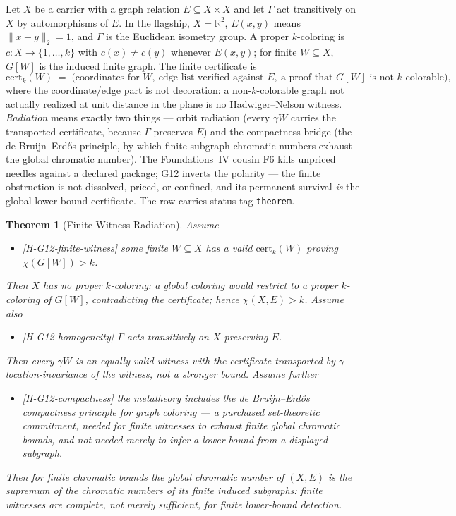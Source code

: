 \documentclass[11pt]{article}
\newcommand{\lawGTwelve}{Finite Witness Radiation}
\newtheorem{theorem}{Theorem}[section]
\theoremstyle{definition}
\begin{document}
Let $X$ be a carrier with a graph relation $E \subseteq X \times X$ and let $\Gamma$ act transitively
on $X$ by automorphisms of $E$. In the flagship, $X = \mathbb{R}^2$, $E(x,y)$ means
$\lVert x - y \rVert_2 = 1$, and $\Gamma$ is the Euclidean isometry group. A proper $k$-coloring is
$c : X \to \{1, \ldots, k\}$ with $c(x) \neq c(y)$ whenever $E(x,y)$; for finite $W \subseteq X$,
$G[W]$ is the induced finite graph. The finite certificate is
\[
  \mathrm{cert}_k(W) \;=\;
  \bigl(\text{coordinates for } W,\ \text{edge list verified against } E,\
  \text{a proof that } G[W] \text{ is not } k\text{-colorable}\bigr),
\]
where the coordinate/edge part is not decoration: a non-$k$-colorable graph not actually realized at
unit distance in the plane is no Hadwiger--Nelson witness. \emph{Radiation} means exactly two things
--- orbit radiation (every $\gamma W$ carries the transported certificate, because $\Gamma$ preserves
$E$) and the compactness bridge (the de Bruijn--Erd\H{o}s principle, by which finite subgraph
chromatic numbers exhaust the global chromatic number). The Foundations~IV cousin F6 kills unpriced
needles against a declared package; G12 inverts the polarity --- the finite obstruction is not
dissolved, priced, or confined, and its permanent survival \emph{is} the global lower-bound
certificate. The row carries status tag \texttt{theorem}.

\begin{theorem}[\lawGTwelve]\label{thm:G12}
Assume
\begin{itemize}
  \item \textup{[H-G12-finite-witness]} some finite $W \subseteq X$ has a valid
    $\mathrm{cert}_k(W)$ proving $\chi(G[W]) > k$.
\end{itemize}
Then $X$ has no proper $k$-coloring: a global coloring would restrict to a proper $k$-coloring of
$G[W]$, contradicting the certificate; hence $\chi(X, E) > k$. Assume also
\begin{itemize}
  \item \textup{[H-G12-homogeneity]} $\Gamma$ acts transitively on $X$ preserving $E$.
\end{itemize}
Then every $\gamma W$ is an equally valid witness with the certificate transported by $\gamma$ ---
location-invariance of the witness, not a stronger bound. Assume further
\begin{itemize}
  \item \textup{[H-G12-compactness]} the metatheory includes the de Bruijn--Erd\H{o}s compactness
    principle for graph coloring --- a purchased set-theoretic commitment, needed for finite
    witnesses to \emph{exhaust} finite global chromatic bounds, and not needed merely to infer a
    lower bound from a displayed subgraph.
\end{itemize}
Then for finite chromatic bounds the global chromatic number of $(X, E)$ is the supremum of the
chromatic numbers of its finite induced subgraphs: finite witnesses are complete, not merely
sufficient, for finite lower-bound detection.
\end{theorem}
\end{document}
